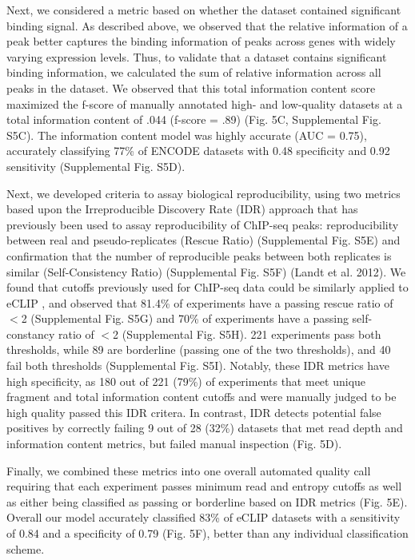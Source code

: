 Next, we considered a metric based on whether the dataset contained significant binding signal. As described above, we observed that the relative information of a peak better captures the binding information of peaks across genes with widely varying expression levels. Thus, to validate that a dataset contains significant binding information, we calculated the sum of relative information across all peaks in the dataset. We observed that this total information content score maximized the f-score of manually annotated high- and low-quality datasets at a total information content of .044 (f-score = .89) (Fig. 5C, Supplemental Fig. S5C). The information content model was highly accurate (AUC = 0.75), accurately classifying 77\% of ENCODE datasets with 0.48 specificity and 0.92 sensitivity (Supplemental Fig. S5D).

Next, we developed criteria to assay biological reproducibility, using two metrics based upon the Irreproducible Discovery Rate (IDR) approach that has previously been used to assay reproducibility of ChIP-seq peaks: reproducibility between real and pseudo-replicates (Rescue Ratio) (Supplemental Fig. S5E) and confirmation that the number of reproducible peaks between both replicates is similar (Self-Consistency Ratio) (Supplemental Fig. S5F) (Landt et al. 2012). We found that cutoffs previously used for ChIP-seq data could be similarly applied to eCLIP \cite{Landt2012}, and observed that 81.4\% of experiments have a passing rescue ratio of $<$2 (Supplemental Fig. S5G) and 70\% of experiments have a passing self-constancy ratio of $<$2 (Supplemental Fig. S5H). 221 experiments pass both thresholds, while 89 are borderline (passing one of the two thresholds), and 40 fail both thresholds (Supplemental Fig. S5I). Notably, these IDR metrics have high specificity, as 180 out of 221 (79\%) of experiments that meet unique fragment and total information content cutoffs and were manually judged to be high quality passed this IDR critera. In contrast, IDR detects potential false positives by correctly failing 9 out of 28 (32\%) datasets that met read depth and information content metrics, but failed manual inspection (Fig. 5D).

Finally, we combined these metrics into one overall automated quality call requiring that each experiment passes minimum read and entropy cutoffs as well as either being classified as passing or borderline based on IDR metrics (Fig. 5E). Overall our model accurately classified 83\% of eCLIP datasets with a sensitivity of 0.84 and a specificity of 0.79 (Fig. 5F), better than any individual classification scheme.


